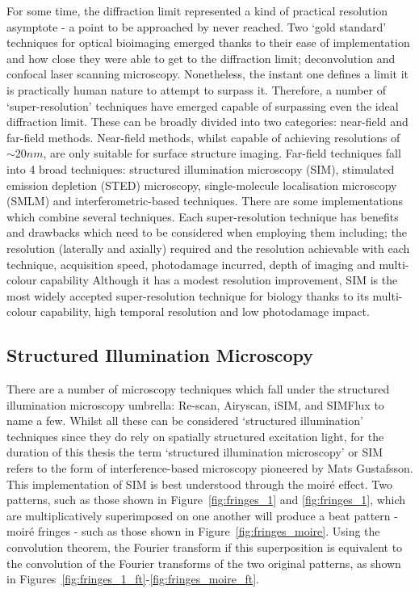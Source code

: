 For some time, the diffraction limit represented a kind of practical 
resolution asymptote - a point to be approached by never reached. Two
`gold standard' techniques for optical bioimaging emerged thanks to their
ease of implementation and how close they were able to get to the diffraction
limit; deconvolution\cite{agard1983three, wallace2001workingperson} and
confocal laser scanning microscopy\cite{sheppard1981theory,minsky1988memoir}. 
Nonetheless, the instant one defines a limit it is practically human nature 
to attempt to surpass it. Therefore, a number of `super-resolution' techniques
have emerged capable of surpassing even the ideal diffraction limit. These
can be broadly divided into two categories: near-field and far-field methods.
Near-field methods, whilst capable of achieving resolutions of $\sim 20 nm$,
are only suitable for surface structure imaging\cite{schermelleh2010guide}. 
Far-field techniques fall into 4 broad techniques: structured illumination
microscopy (SIM), stimulated emission depletion (STED) microscopy, 
single-molecule localisation microscopy (SMLM) and interferometric-based 
techniques. There are some implementations which combine several 
techniques. Each super-resolution technique has benefits and drawbacks which 
need to be considered when employing them including; the resolution 
(laterally and axially) required and the resolution achievable with each 
technique, acquisition speed, photodamage incurred, depth of imaging and 
multi-colour capability\cite{hell20152015,schermelleh2019super} Although it 
has a modest resolution improvement, SIM is the most widely accepted 
super-resolution technique for biology thanks to its multi-colour capability,
high temporal resolution and low photodamage impact\cite{leung2011review}.

\subsection{Structured Illumination Microscopy}
\label{subsec:SIM}

There are a number of microscopy techniques which fall under the structured
illumination microscopy umbrella: Re-scan\cite{de2013re}, 
Airyscan\cite{huff2015airyscan}, iSIM\cite{york2013instant,curd2015construction},
and SIMFlux\cite{cnossen2020localization} to name a few. Whilst all these can be 
considered `structured illumination' techniques since they do rely on spatially 
structured excitation light, for the duration of this thesis the term 
`structured illumination microscopy' or SIM refers to the form of 
interference-based microscopy pioneered by Mats 
Gustafsson\cite{gustafsson1999extended,gustafsson2000surpassing,gustafsson2008three}.
This implementation of SIM is best understood through the moir\'{e} effect.
Two patterns, such as those shown in Figure~\ref{fig:fringes_1} and 
\ref{fig:fringes_1}, which are multiplicatively superimposed on one another
will produce a beat pattern - moir\'{e} fringes - such as those shown in
Figure~\ref{fig:fringes_moire}. Using the convolution theorem, the Fourier
transform if this superposition is equivalent to the convolution of the 
Fourier transforms of the two original patterns\cite{mcgillem1991continuous},
as shown in Figures~\ref{fig:fringes_1_ft}-\ref{fig:fringes_moire_ft}. 

